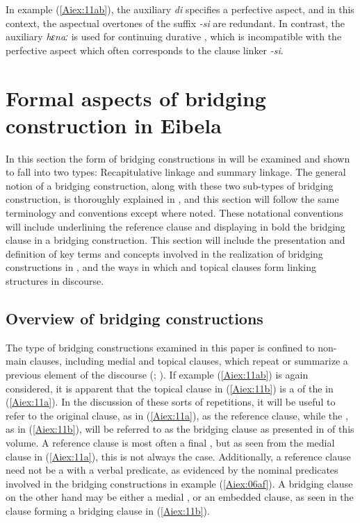 \documentclass[output=paper]{LSP/langsci}
\begin{document}
In example (\ref{Aiex:11ab}), the auxiliary \textit{di} specifies a perfective aspect, and in this context, the aspectual overtones of the suffix \textit{-si} are redundant. In contrast, the auxiliary \textit{hɛnaː} is used for continuing durative , which is incompatible with the perfective aspect which often corresponds to the clause linker \textit{-si}.

\section{Formal aspects of bridging construction in Eibela} 
\label{AiFormal.aspects}
In this section the form of bridging constructions in  will be examined and shown to fall into two types: Recapitulative linkage and summary linkage. The general notion of a bridging construction, along with these two sub-types of bridging construction, is thoroughly explained in , and this section will follow the same terminology and conventions except where noted. These notational conventions will include underlining the reference clause and displaying in bold the bridging clause in a bridging construction. This section will include the presentation and definition of key terms and concepts involved in the realization of bridging constructions in , and the ways in which  and topical clauses form linking structures in  discourse. 


\subsection{Overview of bridging constructions} 
\label{AiOverview}
The type of bridging constructions examined in this paper is confined to non-main clauses, including medial and topical clauses, which repeat or summarize a previous element of the discourse (\citealt{devries.2005,devries.2006,dixon09}; \citealt[][382--383]{Thompson.et.al.2007}). If example (\ref{Aiex:11ab}) is again considered, it is apparent that the topical clause in (\ref{Aiex:11b}) is a  of the  in (\ref{Aiex:11a}). In the discussion of these sorts of repetitions, it will be useful to refer to the original clause, as in (\ref{Aiex:11a}), as the reference clause, while the , as in (\ref{Aiex:11b}), will be referred to as the bridging clause as presented in  of this volume. A reference clause is most often a final , but as seen from the medial clause in (\ref{Aiex:11a}), this is not always the case. Additionally, a reference clause need not be a  with a verbal predicate, as evidenced by the nominal predicates involved in the bridging constructions in example (\ref{Aiex:06af}). A bridging clause on the other hand may be either a medial , or an embedded  clause, as seen in the  clause forming a bridging clause in (\ref{Aiex:11b}).
\end{document}
